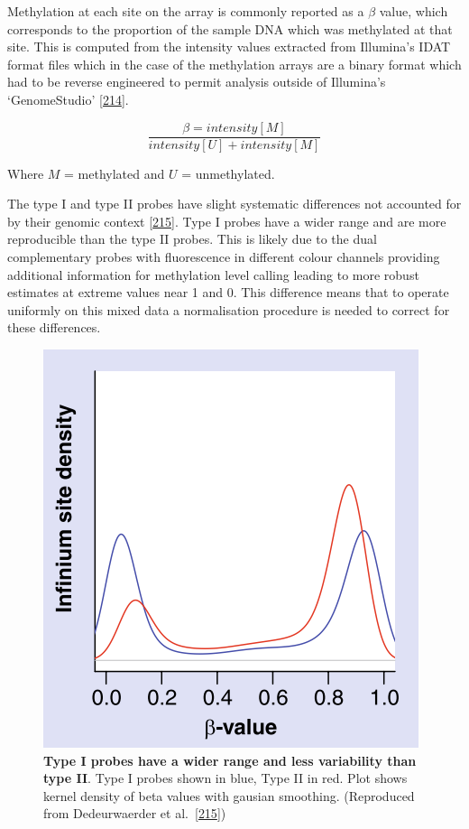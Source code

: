 \documentclass[
]{book}
\begin{document}
Methylation at each site on the array is commonly reported as a \(\beta\) value, which corresponds to the proportion of the sample DNA which was methylated at that site.
This is computed from the intensity values extracted from Illumina's IDAT format files which in the case of the methylation arrays are a binary format which had to be reverse engineered to permit analysis outside of Illumina's `GenomeStudio' {[}\protect\hyperlink{ref-Smith2013}{214}{]}.

\[\frac{\beta=intensity[M]}{intensity[U] + intensity[M]}\]

Where \(M\) = methylated and \(U\) = unmethylated.

The type I and type II probes have slight systematic differences not accounted for by their genomic context {[}\protect\hyperlink{ref-Dedeurwaerder2011}{215}{]}.
Type I probes have a wider range and are more reproducible than the type II probes.
This is likely due to the dual complementary probes with fluorescence in different colour channels providing additional information for methylation level calling leading to more robust estimates at extreme values near 1 and 0.
This difference means that to operate uniformly on this mixed data a normalisation procedure is needed to correct for these differences.

\begin{figure}

{\centering \includegraphics[width=0.5\linewidth]{figs/Dedeurwaerder2011fig1bL} 

}

\caption{\textbf{Type I probes have a wider range and less variability than type II}. Type I probes shown in blue, Type II in red. Plot shows kernel density of beta values with gausian smoothing. (Reproduced from Dedeurwaerder et al.~{[}\protect\hyperlink{ref-Dedeurwaerder2011}{215}{]})}\label{fig:Dedeurwaerder2011fig1bL}
\end{figure}
\end{document}
